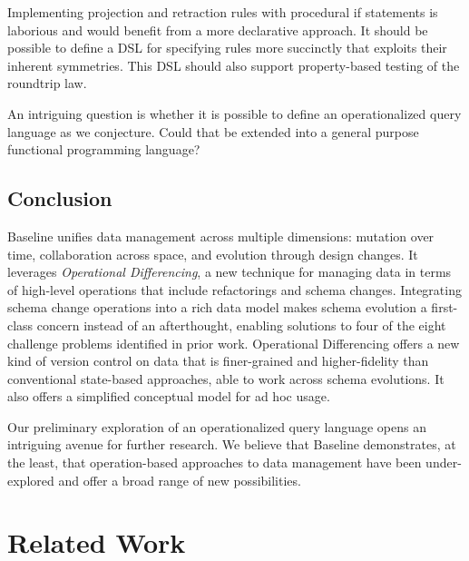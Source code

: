 \documentclass[english,submission]{programming}
\theoremstyle{definition}
\begin{document}
Implementing projection and retraction rules with procedural if statements is laborious and would benefit from a more declarative approach. It should be possible to define a DSL for specifying rules more succinctly that exploits their inherent symmetries.
This DSL should also support property-based testing of the roundtrip law.

An intriguing question is whether it is possible to define an operationalized query language as we conjecture. Could that be extended into a general purpose functional programming language?



\subsection{Conclusion}

Baseline unifies data management across multiple dimensions: mutation over time, collaboration across space, and evolution through design changes. It leverages \textit{Operational Differencing}, a new technique for managing data in terms of high-level operations that include refactorings and schema changes.
Integrating schema change operations into a rich data model makes schema evolution a first-class concern instead of an afterthought, enabling solutions to four of the eight challenge problems identified in prior work.
Operational Differencing offers a new kind of version control on data that is finer-grained and higher-fidelity than conventional state-based approaches, able to work across schema evolutions. It also offers a simplified conceptual model for ad hoc usage.

Our preliminary exploration of an operationalized query language opens an intriguing avenue for further research.
We believe that Baseline demonstrates, at the least, that operation-based approaches to data management have been under-explored and offer a broad range of new possibilities.


\section{Related Work}

\end{document}
